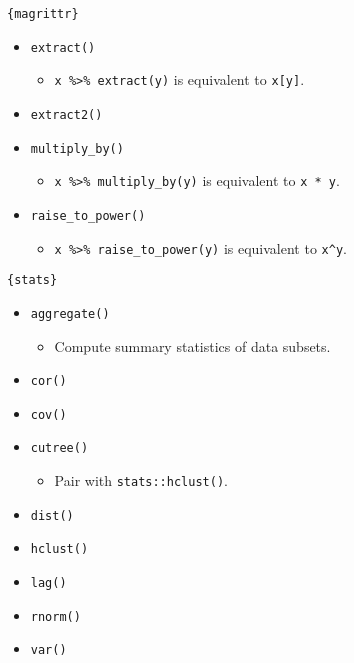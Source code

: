 \documentclass[
]{book}
\providecommand{\tightlist}{%
  \setlength{\itemsep}{0pt}\setlength{\parskip}{0pt}}
\begin{document}
\texttt{\{magrittr\}}

\begin{itemize}
\tightlist
\item
  \texttt{extract()}

  \begin{itemize}
  \tightlist
  \item
    \texttt{x\ \%\textgreater{}\%\ extract(y)} is equivalent to \texttt{x{[}y{]}}.
  \end{itemize}
\item
  \texttt{extract2()}
\item
  \texttt{multiply\_by()}

  \begin{itemize}
  \tightlist
  \item
    \texttt{x\ \%\textgreater{}\%\ multiply\_by(y)} is equivalent to \texttt{x\ *\ y}.
  \end{itemize}
\item
  \texttt{raise\_to\_power()}

  \begin{itemize}
  \tightlist
  \item
    \texttt{x\ \%\textgreater{}\%\ raise\_to\_power(y)} is equivalent to \texttt{x\^{}y}.
  \end{itemize}
\end{itemize}

\texttt{\{stats\}}

\begin{itemize}
\tightlist
\item
  \texttt{aggregate()}

  \begin{itemize}
  \tightlist
  \item
    Compute summary statistics of data subsets.
  \end{itemize}
\item
  \texttt{cor()}
\item
  \texttt{cov()}
\item
  \texttt{cutree()}

  \begin{itemize}
  \tightlist
  \item
    Pair with \texttt{stats::hclust()}.
  \end{itemize}
\item
  \texttt{dist()}
\item
  \texttt{hclust()}
\item
  \texttt{lag()}
\item
  \texttt{rnorm()}
\item
  \texttt{var()}
\end{itemize}
\end{document}
